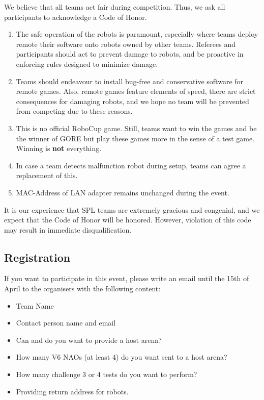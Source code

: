 We believe that all teams act fair during competition. Thus, we ask all participants to acknowledge a Code of Honor.
\begin{enumerate}
    \item The safe operation of the robots is paramount, especially where teams deploy remote their software onto robots owned by other teams. Referees and participants should act to prevent damage to robots, and be proactive in enforcing rules  designed to minimize damage.
    \item Teams should endeavour to install bug-free and conservative software for remote games. Also, remote games feature elements of speed, there are strict consequences for damaging robots, and we hope no team will be prevented from competing due to these reasons.
    \item This is no official RoboCup game. Still, teams want to win the games and be the winner of GORE but play these games more in the sense of a test game. Winning is \textbf{not} everything.
    \item In case a team detects malfunction robot during setup, teams can agree a replacement of this.
    \item MAC-Address of LAN adapter remains unchanged during the event.
\end{enumerate} 

It is our experience that SPL teams are extremely gracious and congenial, and we expect that the Code of Honor will be honored. However, violation of this code may result in immediate disqualification.

\subsection{Registration}

If you want to participate in this event, please write an email until the 15th of April to the organisers with the following content:
\begin{itemize}
    \item Team Name
    \item Contact person name and email
    \item Can and do you want to provide a host arena?
    \item How many V6 NAOs (at least 4) do you want sent to a host arena?
    \item How many challenge 3 or 4 tests do you want to perform?
    \item Providing return address for robots.
\end{itemize}

